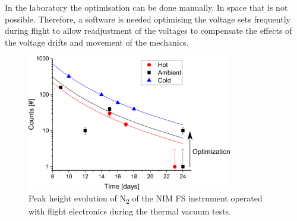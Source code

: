 		In the laboratory the optimisation can be done manually. In space that is not possible. Therefore, a software is needed optimising the voltage sets frequently %
		during flight to allow readjustment of the voltages to compensate the effects of the voltage drifts and movement of the mechanics. %
		\begin{figure}[h!]
			\centering
			\includegraphics[width= 0.8\textwidth]{Experiments/TVT_SignalEvol.png}
			\caption{Peak height evolution of N\textsubscript{2} of the NIM FS instrument operated with flight electronics during the thermal vacuum tests.}
			\label{fig:expFSTVT}
		\end{figure}
	
	
	
	
	
	
	
	
	
	
	
	
	
	
	